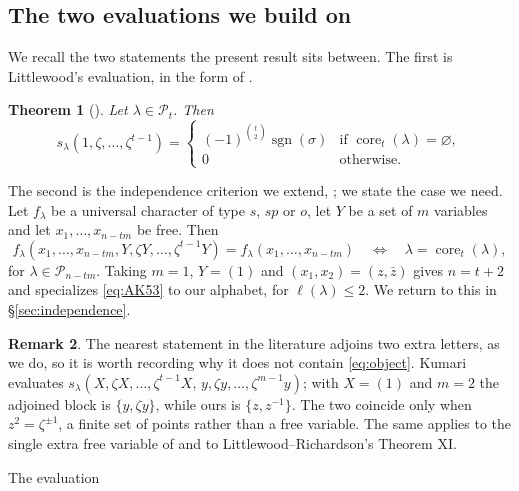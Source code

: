 \documentclass[11pt,reqno]{amsart}
\makeatletter
\renewcommand\section{\@startsection{section}{1}%
  \z@{\linespacing\@plus\linespacing}{.5\linespacing}%
  {\normalfont\large\bfseries\centering}}
\theoremstyle{plain}
\newtheorem{theorem}{Theorem}[section]
\theoremstyle{definition}
\newtheorem{remark}[theorem]{Remark}
\newcommand{\PP}{\mathcal{P}}
\newcommand{\sgn}{\operatorname{sgn}}
\newcommand{\core}{\operatorname{core}}
\newcommand{\zb}{\bar z}
\makeatother
\begin{document}
\subsection{The two evaluations we build on}
We recall the two statements the present result sits between. The first is Littlewood's evaluation,
in the form of \cite[Theorem 2.2]{AK25}.

\begin{theorem}[{\cite[Theorem IX]{LR34}}]\label{thm:LR}
Let $\lambda\in\PP_t$. Then
\[
s_\lambda(1,\zeta,\dots,\zeta^{t-1})=
\begin{cases}
(-1)^{\binom{t}{2}}\sgn(\sigma) & \text{if }\core_t(\lambda)=\varnothing,\\
0 & \text{otherwise.}
\end{cases}
\]
\end{theorem}

The second is the independence criterion we extend, \cite[Theorem 5.3]{AK25}; we state the case we
need. Let $f_\lambda$ be a universal character of type $s$, $sp$ or $o$, let $Y$ be a set of $m$
variables and let $x_1,\dots,x_{n-tm}$ be free. Then
\begin{equation}\label{eq:AK53}
f_\lambda(x_1,\dots,x_{n-tm},Y,\zeta Y,\dots,\zeta^{t-1}Y)=f_\lambda(x_1,\dots,x_{n-tm})
\quad\Longleftrightarrow\quad \lambda=\core_t(\lambda),
\end{equation}
for $\lambda\in\PP_{n-tm}$. Taking $m=1$, $Y=(1)$ and $(x_1,x_2)=(z,\zb)$ gives $n=t+2$ and specializes
\eqref{eq:AK53} to our alphabet, for $\ell(\lambda)\le2$. We return to this in
\S\ref{sec:independence}.

\begin{remark}\label{rem:notacase}
The nearest statement in the literature adjoins two extra letters, as we do, so it is worth recording
why it does not contain \eqref{eq:object}. Kumari \cite[Theorem 2.2]{Kum24} evaluates
$s_\lambda(X,\zeta X,\dots,\zeta^{t-1}X,\,y,\zeta y,\dots,\zeta^{m-1}y)$; with $X=(1)$ and $m=2$ the
adjoined block is $\{y,\zeta y\}$, while ours is $\{z,z^{-1}\}$. The two coincide only when
$z^{2}=\zeta^{\pm1}$, a finite set of points rather than a free variable. The same applies to the
single extra free variable of \cite[Theorem 2.7]{AK22} and to Littlewood--Richardson's Theorem XI.
\end{remark}

\section{The evaluation}\label{sec:main}
\end{document}
